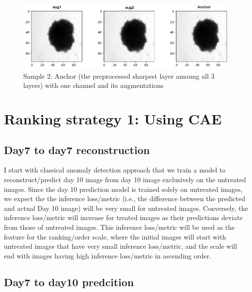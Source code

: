 \begin{figure}[H]
  \centering
  \includegraphics[width=0.9\linewidth]{figures/1_2.png} %
  \caption{Sample 2: Anchor (the preprocessed sharpest layer amoung all 3 layers) with one channel and its augmentations}
  \label{fig:1doutput3}
\end{figure}
\section{Ranking strategy 1: Using CAE}

\subsection{Day7 to day7 reconstruction}
I start with classical anomaly detection approach that we train a model to 
reconstruct/predict day 10 image from day 10 image exclusively on the untreated images. Since the day 10 prediction model is trained solely on untreated images,
 we expect the the inference loss/metric (i.e., the difference between the predicted and actual Day 10 image) will be very small for untreated images.
Conversely, the inference loss/metric will increase for treated images as their predictions deviate from those of untreated images.
 This inference loss/metric will be used as the feature for the ranking/order scale, where the initial images will start 
 with untreated images that have very small inference loss/metric, and the scale will end with images having high inference loss/metric in ascending order.


\subsection{Day7 to day10 predcition}
